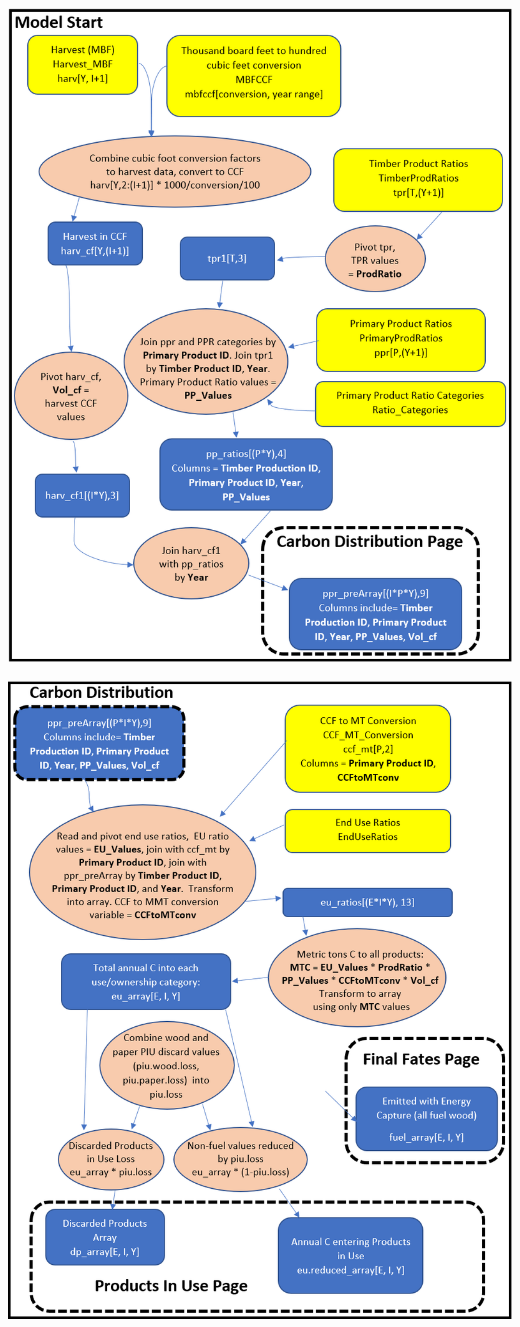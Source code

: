 \documentclass[
  openany]{book}
\begin{document}
\newpage

\includegraphics[width=1\linewidth]{images/schematic-1}

\newpage

\includegraphics[width=1\linewidth]{images/schematic-2}
\end{document}
